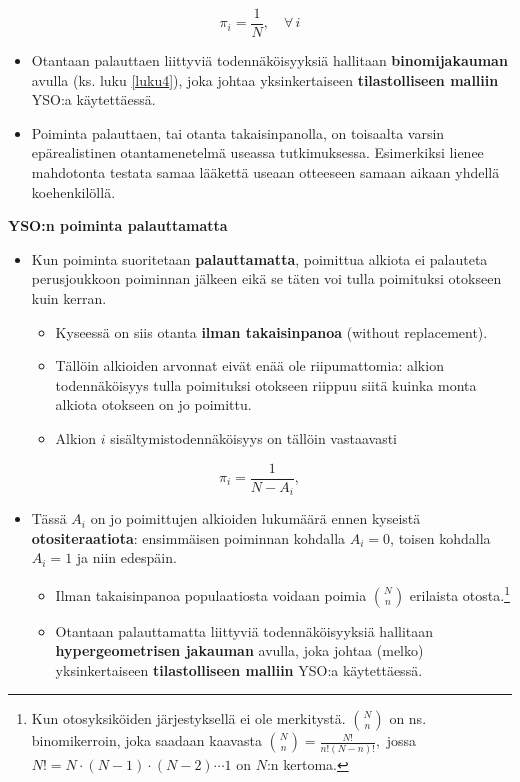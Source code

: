 \documentclass[
]{book}
\providecommand{\tightlist}{%
  \setlength{\itemsep}{0pt}\setlength{\parskip}{0pt}}
\begin{document}
\[
\pi_i = \frac{1}{N}, \quad \forall \, i
\]

\begin{itemize}
\item
  Otantaan palauttaen liittyviä todennäköisyyksiä hallitaan \textbf{binomijakauman} avulla (ks. luku \ref{luku4}), joka johtaa yksinkertaiseen \textbf{tilastolliseen malliin} YSO:a käytettäessä.
\item
  Poiminta palauttaen, tai otanta takaisinpanolla, on toisaalta varsin epärealistinen otantamenetelmä useassa tutkimuksessa. Esimerkiksi lienee mahdotonta testata samaa lääkettä useaan otteeseen samaan aikaan yhdellä koehenkilöllä.
\end{itemize}

\textbf{YSO:n poiminta palauttamatta}

\begin{itemize}
\tightlist
\item
  Kun poiminta suoritetaan \textbf{palauttamatta}, poimittua alkiota ei palauteta perusjoukkoon poiminnan jälkeen eikä se täten voi tulla poimituksi otokseen kuin kerran.

  \begin{itemize}
  \tightlist
  \item
    Kyseessä on siis otanta \textbf{ilman takaisinpanoa} (without replacement).
  \item
    Tällöin alkioiden arvonnat eivät enää ole riipumattomia: alkion todennäköisyys tulla poimituksi otokseen riippuu siitä kuinka monta alkiota otokseen on jo poimittu.
  \item
    Alkion \(i\) sisältymistodennäköisyys on tällöin vastaavasti
  \end{itemize}
\end{itemize}

\[
\pi_i = \frac{1}{N - A_i},
\]

\begin{itemize}
\tightlist
\item
  Tässä \(A_i\) on jo poimittujen alkioiden lukumäärä ennen kyseistä \textbf{otositeraatiota}: ensimmäisen poiminnan kohdalla \(A_i = 0\), toisen kohdalla \(A_i = 1\) ja niin edespäin.

  \begin{itemize}
  \tightlist
  \item
    Ilman takaisinpanoa populaatiosta voidaan poimia \({N \choose n}\) erilaista otosta.\footnote{Kun otosyksiköiden järjestyksellä ei ole merkitystä. \({N \choose n}\) on ns. binomikerroin, joka saadaan kaavasta \({N \choose n} = \frac{N!}{n!(N-n)!},\) jossa \(N! = N \cdot (N-1) \cdot (N-2) \cdots 1\) on \(N\):n kertoma.}
  \item
    Otantaan palauttamatta liittyviä todennäköisyyksiä hallitaan \textbf{hypergeometrisen jakauman} avulla, joka johtaa (melko) yksinkertaiseen \textbf{tilastolliseen malliin} YSO:a käytettäessä.
  \end{itemize}
\end{itemize}
\end{document}
